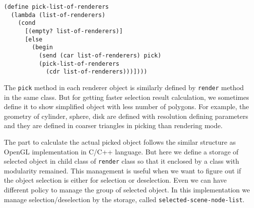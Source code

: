 \documentclass[preprint,nocopyrightspace]{sigplanconf}
\begin{document}
\begin{verbatim}
(define pick-list-of-renderers
  (lambda (list-of-renderers)
    (cond
      [(empty? list-of-renderers)]
      [else 
        (begin
          (send (car list-of-renderers) pick)
          (pick-list-of-renderers 
            (cdr list-of-renderers)))])))
\end{verbatim}
The {\tt pick} method in each renderer object is similarly defined by {\tt render} method in the same class. But for getting faster selection result calculation, we sometimes define it to show simplified object with less number of polygons. For example, the geometry of cylinder, sphere, disk are defined with resolution defining parameters and they are defined in coarser triangles in picking than rendering mode.

The part to calculate the actual picked object follows the similar structure as OpenGL implementation in C/C++ language. But here we define a storage of selected object in child class of {\tt render} class so that it enclosed by a class with modularity remained. This management is useful when we want to figure out if the object selection is either for selection or deselection. Even we can have different policy to manage the group of selected object. In this implementation we manage selection/deselection by the storage, called {\tt selected-scene-node-list}.
\end{document}
